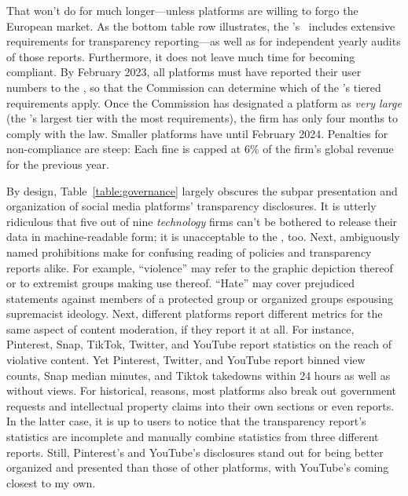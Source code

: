 That won't do for much longer---unless platforms are willing to forgo the
European market. As the bottom table row illustrates, the \EU's \DSA\ includes
extensive requirements for transparency reporting---as well as for independent
yearly audits of those reports. Furthermore, it does not leave much time for
becoming compliant. By February 2023, all platforms must have reported their
user numbers to the \EU, so that the Commission can determine which of the
\DSA's tiered requirements apply. Once the Commission has designated a platform
as \emph{very large} (the \DSA's largest tier with the most requirements), the
firm has only four months to comply with the law. Smaller platforms have until
February 2024. Penalties for non-compliance are steep: Each fine is capped at
6\% of the firm's global revenue for the previous year.

By design, Table~\ref{table:governance} largely obscures the subpar presentation
and organization of social media platforms' transparency disclosures. It is
utterly ridiculous that five out of nine \emph{technology} firms can't be
bothered to release their data in machine-readable form; it is unacceptable to
the \EU, too. Next, ambiguously named prohibitions make for confusing reading of
policies and transparency reports alike. For example, ``violence'' may refer to
the graphic depiction thereof or to extremist groups making use thereof.
``Hate'' may cover prejudiced statements against members of a protected group or
organized groups espousing supremacist ideology. Next, different platforms
report different metrics for the same aspect of content moderation, if they
report it at all. For instance, Pinterest, Snap, TikTok, Twitter, and YouTube
report statistics on the reach of violative content. Yet Pinterest, Twitter, and
YouTube report binned view counts, Snap median minutes, and Tiktok takedowns
within 24 hours as well as without views. For historical, reasons, most
platforms also break out government requests and intellectual property claims
into their own sections or even reports. In the latter case, it is up to users
to notice that the transparency report's statistics are incomplete and manually
combine statistics from three different reports. Still, Pinterest's and
YouTube's disclosures stand out for being better organized and presented than
those of other platforms, with YouTube's coming closest to my own.

